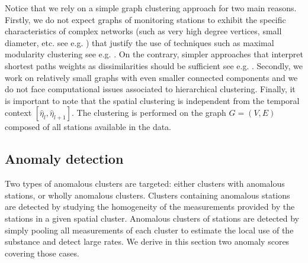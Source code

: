 
Notice that we rely on a simple graph clustering approach for two main reasons. Firstly, we do not expect graphs of monitoring stations to exhibit the specific characteristics of complex networks (such as very high degree vertices, small diameter, etc. see e.g. \cite{Newman2003GraphSurveySIAM}) that justify the use of techniques such as maximal modularity clustering see e.g. \cite{FortunatoSurveyGraphs2010}. On the contrary, simpler approaches that interpret shortest paths weights as dissimilarities should be sufficient see e.g. \cite{Schaeffer:COSREV2007}. Secondly, we work on relatively small graphs with even smaller connected components and we do not face computational issues associated to hierarchical clustering. 
Finally, it is important to note that the spatial clustering is independent from the temporal context $[\widehat{\eta}_l,\widehat{\eta}_{l+1}]$. The clustering is performed on the graph $G=(V,E)$ composed of all stations available in the data. 

\subsection{Anomaly detection}\label{section:anomaly}

Two types of anomalous clusters are targeted: either clusters with anomalous stations, or wholly anomalous clusters. Clusters containing anomalous stations are detected by studying the homogeneity of the measurements provided by the stations in a given spatial cluster. Anomalous clusters of stations are detected by simply pooling all measurements of each cluster to estimate the local use of the substance and detect large rates. We derive in this section two anomaly scores covering those cases.

